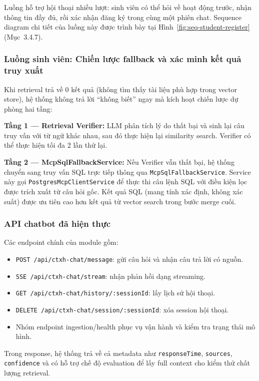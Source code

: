 Luồng hỗ trợ hội thoại nhiều lượt: sinh viên có thể hỏi về hoạt động trước, nhận thông tin đầy đủ, rồi xác nhận đăng ký trong cùng một phiên chat. Sequence diagram chi tiết của luồng này được trình bày tại Hình~\ref{fig:seq-student-register} (Mục~3.4.7).

\subsubsection{Luồng sinh viên: Chiến lược fallback và xác minh kết quả truy xuất}
Khi retrieval trả về 0 kết quả (không tìm thấy tài liệu phù hợp trong vector store), hệ thống không trả lời ``không biết'' ngay mà kích hoạt chiến lược dự phòng hai tầng:

\textbf{Tầng 1 — Retrieval Verifier:} LLM phân tích lý do thất bại và sinh lại câu truy vấn với từ ngữ khác nhau, sau đó thực hiện lại similarity search. Verifier có thể thực hiện tối đa 2 lần thử lại.

\textbf{Tầng 2 — McpSqlFallbackService:} Nếu Verifier vẫn thất bại, hệ thống chuyển sang truy vấn SQL trực tiếp thông qua \texttt{McpSqlFallbackService}. Service này gọi \texttt{PostgresMcpClientService} để thực thi câu lệnh SQL với điều kiện lọc được trích xuất từ câu hỏi gốc. Kết quả SQL (mang tính xác định, không xác suất) được ưu tiên cao hơn kết quả từ vector search trong bước merge cuối.

\subsubsection{API chatbot đã hiện thực}
Các endpoint chính của module gồm:
\begin{itemize}
	\item \texttt{POST /api/ctxh-chat/message}: gửi câu hỏi và nhận câu trả lời có nguồn.
	\item \texttt{SSE /api/ctxh-chat/stream}: nhận phản hồi dạng streaming.
	\item \texttt{GET /api/ctxh-chat/history/:sessionId}: lấy lịch sử hội thoại.
	\item \texttt{DELETE /api/ctxh-chat/session/:sessionId}: xóa session hội thoại.
	\item Nhóm endpoint ingestion/health phục vụ vận hành và kiểm tra trạng thái mô hình.
\end{itemize}

Trong response, hệ thống trả về cả metadata như \texttt{responseTime}, \texttt{sources}, \texttt{confidence} và có hỗ trợ chế độ evaluation để lấy full context cho kiểm thử chất lượng retrieval.

